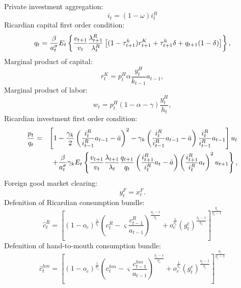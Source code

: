 \documentclass[12pt]{article}
\begin{document}
Private investment aggregation:
\begin{equation}
i_t = (1-\omega)i_t^R
\label{eq:EE_22}
\end{equation}
Ricardian capital first order condition:
\begin{equation}
q_{t}=\frac{\beta }{a_{t}^{\sigma }}E_{t}\left\{ \frac{v_{t+1}}{v_{t}}\frac{%
\lambda _{t+1}^R}{\lambda _{t}^R}\left[ (1-\tau^k_{t+1})r_{t+1}^{K}+\tau^k_{t+1}\delta + q_{t+1}(1-\delta )\right]
\right\} ,  \label{eq:EE_23}
\end{equation}
Marginal product of capital:
\begin{equation}
r_t^K = p_t^H \alpha \frac{y_t^H}{k_{t-1}}a_{t-1}, \label{eq:EE_24}
\end{equation}
Marginal product of labor:
\begin{equation}
w_t = p_t^H (1-\alpha-\gamma) \frac{y_t^H}{h_t}, \label{eq:EE_25}
\end{equation}
Ricardian investment first order condition:
\begin{eqnarray}
\frac{p_t}{q_{t}} &=&\left[ 1-\frac{\gamma_k }{2}\left( \frac{i^R_{t}}{i^R_{t-1}}%
a_{t-1}-\bar{a}\right) ^{2}-\gamma_k \left( \frac{i^R_{t}}{i^R_{t-1}}a_{t-1}-\bar{a%
}\right) \frac{i^R_{t}}{i^R_{t-1}}a_{t-1}\right] u_{t}  \notag \\
&&+\frac{\beta }{a_{t}^{\sigma }}\gamma_k E_{t}\left\{ \frac{v_{t+1}}{v_{t}}%
\frac{\lambda _{t+1}}{\lambda _{t}}\frac{q_{t+1}}{q_{t}}\left( \frac{i^R_{t+1}%
}{i^R_{t}}a_{t}-\bar{a}\right) \left( \frac{i^R_{t+1}}{i^R_{t}}a_{t}\right)
^{2}u_{t+1}\right\} ,  \label{eq:EE_26}
\end{eqnarray}%
Foreign good market clearing:
\begin{equation}
y_{t}^{F}=x_{t}^{F}.  \label{eq:EE_27}
\end{equation}%
Defenition of Ricardian consumption bundle:
\begin{equation}
 \hat{c}_t^R = \left[(1-o_c)^{\frac{1}{\eta_c}}\left(c_t^R-\varsigma \frac{c_{t-1}^R}{a_{t-1}}\right)^{\frac{\eta_c-1}{\eta_c}}+o_c^{\frac{1}{\eta_c}}\left(g_t^c\right)^{\frac{\eta_c-1}{\eta_c}}\right]^{\frac{\eta_c}{\eta_c-1}} 
 \label{eq:EE_28}
\end{equation}
Defenition of hand-to-mouth consumption bundle:
\begin{equation}
\hat{c}_t^{hm} = \left[(1-o_c)^{\frac{1}{\eta_c}}\left(c_t^{hm}-\varsigma \frac{c_{t-1}^{hm}}{a_{t-1}}\right)^{\frac{\eta_c-1}{\eta_c}}+o_c^{\frac{1}{\eta_c}}\left(g_t^c\right)^{\frac{\eta_c-1}{\eta_c}}\right]^{\frac{\eta_c}{\eta_c-1}} 
 \label{eq:EE_29}
\end{equation}
\end{document}
